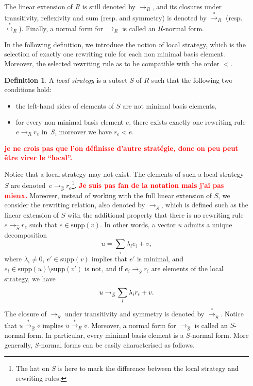 \documentclass[10pt]{easychair}
\theoremstyle{definition}
\newtheorem{definition}[theorem]{Definition}
\newcommand\todo[1]{{\bf\textcolor{red}{#1.}}}
\newcommand\supp{\text{supp}}
\newcommand\rewR{\to_R}
\newcommand\rewS{\to_{\hat{S}}}
\newcommand\transR{\overset{*}{\to}_R}
\newcommand\transS{\overset{*}{\to}_{\hat{S}}}
\newcommand\equivR{\overset{*}{\leftrightarrow}_R}
\begin{document}
The linear extension of $R$ is still denoted by $\rewR$, and its closures
under transitivity, reflexivity and sum (resp. and symmetry) is denoted by $\transR$ (resp. $\equivR$).
Finally, a normal form for $\rewR$ is called an $R$-normal form.
\medskip

In the following definition, we introduce the notion of local strategy,
which is the selection of exactly one rewriting rule for each non minimal
basis element. Moreover, the selected rewriting rule as to be compatible
with the order $<$.
\smallskip

\begin{definition}
  A \emph{local strategy} is a subset $S$ of $R$ such that the following
  two conditions hold:
  \begin{itemize}
  \item the left-hand sides of elements of $S$ are not minimal basis
    elements,
  \item for every non minimal basis element $e$, there exists exactly one
    rewriting rule $e\rewR r_e$ in~$S$, moreover we have $r_e<e$.
  \end{itemize}
  \todo{je ne crois pas que l'on définisse d'autre stratégie, donc on peu peut être virer le ``local''} 
\end{definition}
\smallskip

Notice that a local strategy may not exist. The elements of such a local
strategy $S$ are denoted~$e\rewS r_e$\footnote{The hat on $S$ is here to
  mark the difference between the local strategy and rewriting rules.}.
\todo{Je suis pas fan de la notation mais j'ai pas mieux}
Moreover, instead of working with the full linear extension of $S$, we
consider the rewriting relation, also denoted by $\rewS$, which is
defined such as the linear extension of $S$ with the additional property
that there is no rewriting rule $e\rewS r_e$ such that $e\in\supp(v)$. In
other words, a vector $u$ admits a unique decomposition
\[u=\sum_i\lambda_ie_i+v,\]
where $\lambda_i\neq 0$, $e'\in\supp(v)$ implies that $e'$ is minimal,
and $e_i\in\supp(u)\setminus\supp(v')$ is not, and if $e_i\rewS r_i$ are
elements of the local strategy, we have 
\[u\rewS\sum_i\lambda_ir_i+v.
  \smallskip\]
The closure of $\rewS$ under transitivity and symmetry is denoted by
$\transS$. Notice that $u\transS v$ implies $u\transR v$. Moreover, a
normal form for $\rewS$ is called an $S$-normal form. In particular,
every minimal basis element is a $S$-normal form. More generally,
$S$-normal forms can be easily characterised as follows.
\medskip
\end{document}
